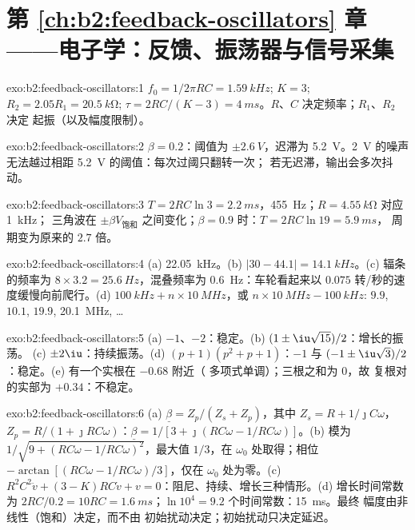 \section*{第 \ref{ch:b2:feedback-oscillators} 章——电子学：反馈、振荡器与信号采集}

\begin{solution}{exo:b2:feedback-oscillators:1}
$f_0 = 1/2\pi RC = \qty{1.59}{kHz}$; $K = 3$; $R_2 = 2.05R_1 = \qty{20.5}{k\ohm}$;
$\tau = 2RC/(K - 3) = \qty{4}{ms}$。$R$、$C$ 决定频率；$R_1$、$R_2$ 决定
起振（以及幅度限制）。
\end{solution}

\begin{solution}{exo:b2:feedback-oscillators:2}
$\beta = 0.2$：阈值为 $\pm\qty{2.6}{V}$，迟滞为 \qty{5.2}{V}。\qty{2}{V} 的噪声
无法越过相距 \qty{5.2}{V} 的阈值：每次过阈只翻转一次；
若无迟滞，输出会多次抖动。
\end{solution}

\begin{solution}{exo:b2:feedback-oscillators:3}
$T = 2RC\ln3 = \qty{2.2}{ms}$，\qty{455}{Hz}；$R = \qty{4.55}{k\ohm}$ 对应 \qty{1}{kHz}；
三角波在 $\pm\beta V_{\text{饱和}}$ 之间变化；$\beta = 0.9$ 时：$T = 2RC\ln19 = \qty{5.9}{ms}$，
周期变为原来的 $2.7$ 倍。
\end{solution}

\begin{solution}{exo:b2:feedback-oscillators:4}
(a) \qty{22.05}{kHz}。(b) $|30 - 44.1| = \qty{14.1}{kHz}$。(c) 辐条的频率为 $8 \times 3.2 =
\qty{25.6}{Hz}$，混叠频率为 \qty{0.6}{Hz}：车轮看起来以
$0.075$ 转/秒的速度缓慢向前爬行。(d) $\qty{100}{kHz} + n \times \qty{10}{MHz}$，或 $n \times \qty{10}{MHz} -
\qty{100}{kHz}$: $9.9$, $10.1$, $19.9$, \qty{20.1}{MHz}, \dots
\end{solution}

\begin{solution}{exo:b2:feedback-oscillators:5}
(a) $-1$、$-2$：稳定。(b) $(1 \pm \iu\sqrt{15})/2$：增长的振荡。
(c) $\pm2\iu$：持续振荡。(d) $(p + 1)(p^2 + p + 1)$：$-1$ 与
$(-1 \pm \iu\sqrt3)/2$：稳定。(e) 有一个实根在 $-0.68$ 附近（
多项式单调）；三根之和为 $0$，故
复根对的实部为 $+0.34$：不稳定。
\end{solution}

\begin{solution}{exo:b2:feedback-oscillators:6}
(a) $\underline\beta = Z_p/(Z_s + Z_p)$，其中 $Z_s = R + 1/\jmath C\omega$，$Z_p = R/(1 +
\jmath RC\omega)$：$\underline\beta = 1/[3 + \jmath(RC\omega - 1/RC\omega)]$。(b) 模为
$1/\sqrt{9 + (RC\omega - 1/RC\omega)^2}$，最大值 $1/3$，在 $\omega_0$ 处取得；相位 $-\arctan
[(RC\omega - 1/RC\omega)/3]$，仅在 $\omega_0$ 处为零。(c) $R^2C^2\ddot v + (3 - K)RC
\dot v + v = 0$：阻尼、持续、增长三种情形。(d) 增长时间常数为
$2RC/0.2 = 10RC = \qty{1.6}{ms}$；$\ln10^4 = 9.2$ 个时间常数：\qty{15}{ms}。最终
幅度由非线性（饱和）决定，而不由
初始扰动决定；初始扰动只决定延迟。
\end{solution}

